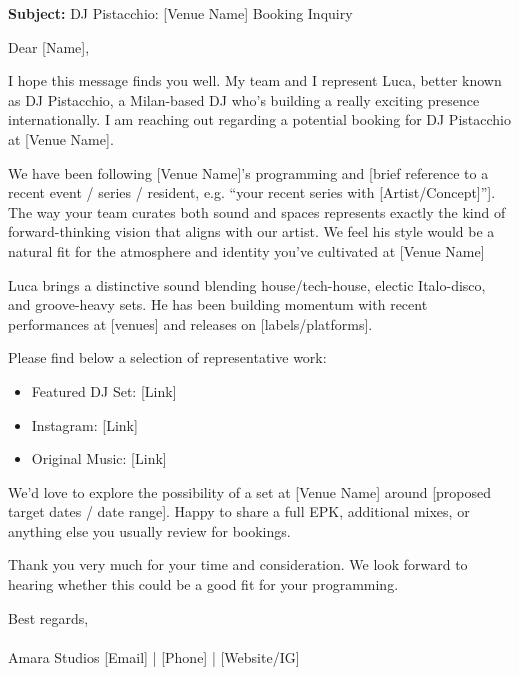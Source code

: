 \documentclass[11pt,a4paper]{article}
\begin{document}
\begin{highlightbox}
\small
\textbf{Subject:} DJ Pistacchio: [Venue Name] Booking Inquiry

\vspace{0.5em}

Dear [Name],

\vspace{0.5em}

I hope this message finds you well. My team and I represent Luca, better known as DJ Pistacchio, a Milan-based DJ who's building a really exciting presence internationally.  I am reaching out regarding a potential booking for DJ Pistacchio at [Venue Name].

\vspace{0.5em}

We have been following [Venue Name]'s programming and [brief reference to a recent event / series / resident, e.g. 
“your recent series with [Artist/Concept]”]. The way your team curates both sound and spaces represents exactly the kind of forward-thinking vision that aligns with our artist. We feel his style would be a natural fit for the atmosphere and identity you've cultivated at [Venue Name]

\vspace{0.5em}

Luca brings a distinctive sound blending house/tech-house, electic Italo-disco, and groove-heavy sets. He has been building momentum with recent performances at [venues] and releases on [labels/platforms].

\vspace{0.5em}

Please find below a selection of representative work:
\vspace{0.5em}
\begin{itemize}[leftmargin=*,topsep=0pt]
    \item Featured DJ Set: [Link]
    \item Instagram: [Link]
    \item Original Music: [Link]
\end{itemize}

\vspace{0.5em}

We’d love to explore the possibility of a set at [Venue Name] around [proposed target dates / date range]. Happy to share a full EPK, additional mixes, or anything else you usually review for bookings.

\vspace{0.5em}

Thank you very much for your time and consideration. We look forward to hearing whether this could be a good fit for your programming.

\vspace{0.5em}
Best regards,\\
[Name]\\
Amara Studios
[Email] | [Phone] | [Website/IG]
\end{highlightbox}
\end{document}
